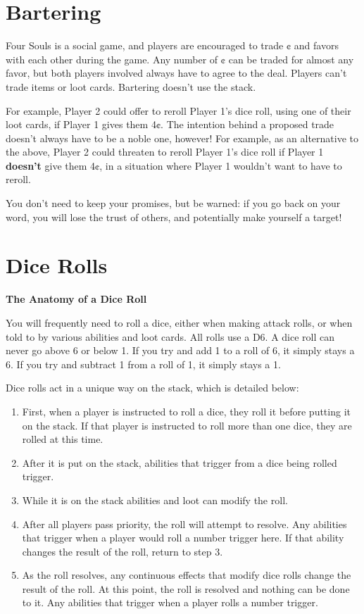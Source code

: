 \documentclass[10pt, a4paper, twoside]{article} %
\begin{document}
    \section{Bartering}
    \label{bartering}
    Four Souls is a social game, and players are encouraged to trade ¢ and favors with each other during the game. Any number of ¢ can be traded for almost any favor, but both players involved always have to agree to the deal. Players can’t trade items or loot cards. Bartering doesn’t use the stack.

    For example, Player 2 could offer to reroll Player 1’s dice roll, using one of their loot cards, if Player 1 gives them 4¢. The intention behind a proposed trade doesn’t always have to be a noble one, however! For example, as an alternative to the above, Player 2 could threaten to reroll Player 1’s dice roll if Player 1 \textbf{doesn’t} give them 4¢, in a situation where Player 1 wouldn’t want to have to reroll.

    You don’t need to keep your promises, but be warned: if you go back on your word, you will lose the trust of others, and potentially make yourself a target!

    \section{Dice Rolls}
    \label{dicerolls}
    \textbf{The Anatomy of a Dice Roll}

    You will frequently need to roll a dice, either when making attack rolls, or when told to by various abilities and loot cards. All rolls use a D6. A dice roll can never go above 6 or below 1. If you try and add 1 to a roll of 6, it simply stays a 6. If you try and subtract 1 from a roll of 1, it simply stays a 1.

    Dice rolls act in a unique way on the stack, which is detailed below:
    \begin{enumerate}
        \item First, when a player is instructed to roll a dice, they roll it before putting it on the stack. If that player is instructed to roll more than one dice, they are rolled at this time.
        \item After it is put on the stack, abilities that trigger from a dice being rolled trigger.
        \item While it is on the stack abilities and loot can modify the roll.
        \item After all players pass priority, the roll will attempt to resolve. Any abilities that trigger when a player would roll a number trigger here. If that ability changes the result of the roll, return to step 3.
        \item As the roll resolves, any continuous effects that modify dice rolls change the result of the roll. At this point, the roll is resolved and nothing can be done to it. Any abilities that trigger when a player rolls a number trigger.
    \end{enumerate}
\end{document}
